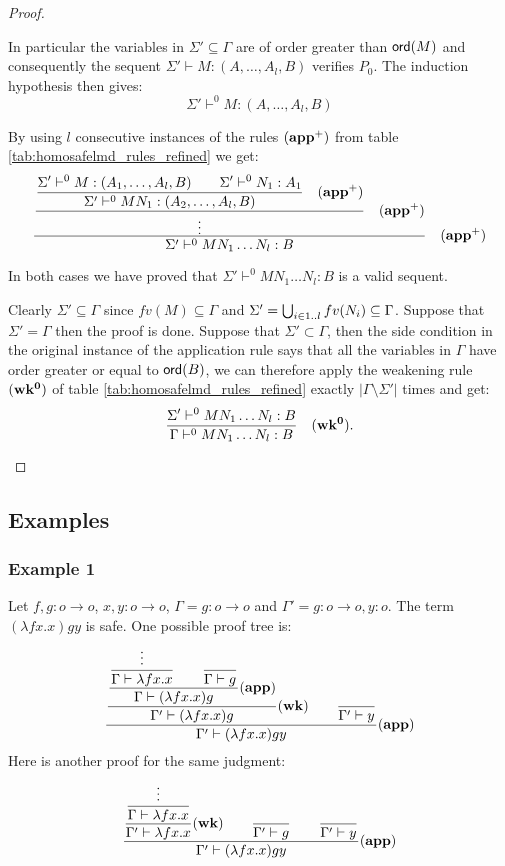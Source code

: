 \begin{proof}
\begin{itemize}
\begin{itemize}
In particular the variables in $\Sigma' \subseteq \Gamma$ are of order greater than ${\sf ord}(M)$ and consequently
the sequent $\Sigma' \vdash M : (A,\ldots,A_l,B)$ verifies $P_0$. The induction hypothesis then gives:
$$\Sigma' \vdash^0 M : (A,\ldots,A_l,B)$$

By using $l$ consecutive instances of the rules $\mathbf{(app^+)}$ from table \ref{tab:homosafelmd_rules_refined} we get:
$$  \frac{\displaystyle  \frac{\displaystyle  \frac{\displaystyle  \Sigma' \vdash^0 M : (A_1,\ldots, A_l,B)
                    \qquad \Sigma'\vdash^{0} N_1 : A_1
                    }{ \Sigma' \vdash^0 M N_1 : (A_2,\ldots, A_l,B)} \quad \mathbf{(app^+)}
          }{ \vdots
          }
          \quad \mathbf{(app^+)}
       }{ \Sigma'  \vdash^{0} M N_1 \ldots N_l : B } \quad \mathbf{(app^+)}
$$
\end{itemize}

In both cases we have proved that $\Sigma'  \vdash^{0} M N_1 \ldots N_l : B$ is a valid sequent.

Clearly $\Sigma' \subseteq \Gamma$ since $fv(M) \subseteq \Gamma$ and $\Sigma' = \bigcup_{i\in1..l} fv(N_i) \subseteq \Gamma$.
Suppose that $\Sigma' = \Gamma$ then the proof is done.
Suppose that $\Sigma' \subset \Gamma$, then the side condition in the original instance of the application rule says that all
the variables in $\Gamma$ have order
greater or equal to ${\sf ord}(B)$, we can therefore apply the weakening rule $\mathbf{(wk^0)}$
of table \ref{tab:homosafelmd_rules_refined} exactly $|\Gamma\setminus \Sigma'|$ times and get:
$$ \frac{\displaystyle \Sigma'  \vdash^{0} M N_1 \ldots N_l : B}{\Gamma  \vdash^{0} M N_1 \ldots N_l : B} \quad
                                   \mathbf{(wk^0)}.
$$


\end{itemize}
\end{proof}


\subsection{Examples}
\subsubsection{Example 1}
Let $f,g:o\rightarrow o$, $x,y:o\rightarrow o$, $\Gamma =
g:o\rightarrow o$ and $\Gamma' = g:o\rightarrow o, y:o$. The term
$(\lambda f x . x) g y $ is safe. One possible proof tree is:
$$ \frac{\displaystyle 
        \frac{\displaystyle 
            \frac{\displaystyle 
                \frac{\displaystyle \vdots}{\Gamma \vdash \lambda f x. x}      \qquad \frac{\displaystyle}{\Gamma \vdash g} }{\Gamma \vdash (\lambda f x. x) g} \mathbf{(app)}
        }{ \Gamma' \vdash (\lambda f x. x) g } \mathbf{(wk)}
        \qquad \frac{\displaystyle}{\Gamma' \vdash y}
    }{ \Gamma' \vdash (\lambda f x. x) g y } \mathbf{(app)}
$$
Here is another proof for the same judgment:
$$ \frac{\displaystyle   \frac{\displaystyle  \frac{\displaystyle \vdots}{\Gamma \vdash \lambda f x. x} }{\Gamma' \vdash \lambda f x. x} \mathbf{(wk)}    \qquad \frac{\displaystyle }{\Gamma' \vdash g} \qquad \frac{\displaystyle }{\Gamma' \vdash y}}{\Gamma' \vdash (\lambda f x. x) g y } \mathbf{(app)}$$

